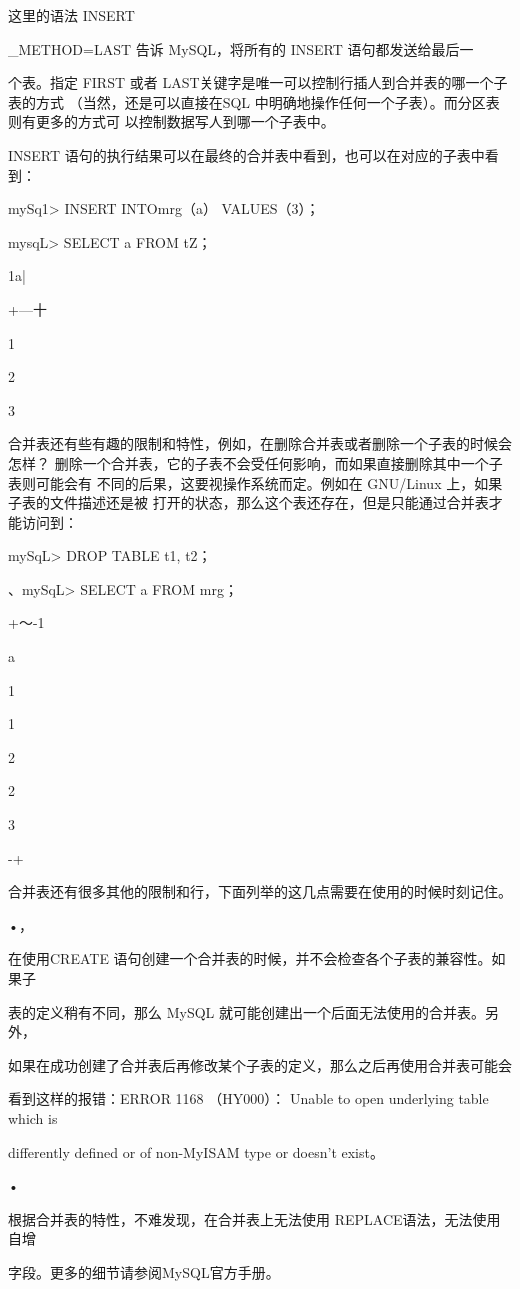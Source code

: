 这里的语法 INSERT

\_METHOD=LAST 告诉 MySQL，将所有的 INSERT 语句都发送给最后一

个表。指定 FIRST 或者 LAST关键字是唯一可以控制行插人到合并表的哪一个子表的方式
（当然，还是可以直接在SQL 中明确地操作任何一个子表）。而分区表则有更多的方式可
以控制数据写人到哪一个子表中。

INSERT 语句的执行结果可以在最终的合并表中看到，也可以在对应的子表中看到：

mySq1> INSERT INTOmrg（a） VALUES（3）；

mysqL> SELECT a FROM tZ；

1a|

+---十

1

2

3

合并表还有些有趣的限制和特性，例如，在删除合并表或者删除一个子表的时候会怎样？
删除一个合并表，它的子表不会受任何影响，而如果直接删除其中一个子表则可能会有
不同的后果，这要视操作系统而定。例如在 GNU/Linux 上，如果子表的文件描述还是被
打开的状态，那么这个表还存在，但是只能通过合并表才能访问到：

mySqL> DROP TABLE t1, t2；

、mySqL> SELECT a FROM mrg；

+～-1

a

1

1

2

2

3

-+

合并表还有很多其他的限制和行，下面列举的这几点需要在使用的时候时刻记住。

•，

在使用CREATE 语句创建一个合并表的时候，并不会检查各个子表的兼容性。如果子

表的定义稍有不同，那么 MySQL 就可能创建出一个后面无法使用的合并表。另外，

如果在成功创建了合并表后再修改某个子表的定义，那么之后再使用合并表可能会

看到这样的报错：ERROR 1168 （HY000）： Unable to open underlying table which is

differently defined or of non-MyISAM type or doesn't exist。

•

根据合并表的特性，不难发现，在合并表上无法使用 REPLACE语法，无法使用自增

字段。更多的细节请参阅MySQL官方手册。

